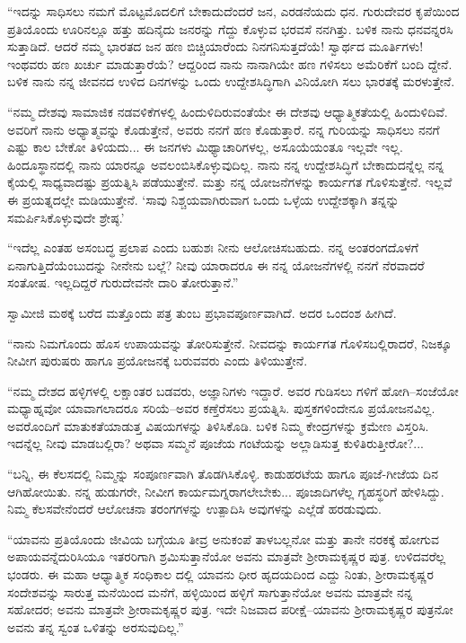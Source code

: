 “ಇದನ್ನು ಸಾಧಿಸಲು ನಮಗೆ ಮೊಟ್ಟಮೊದಲಿಗೆ ಬೇಕಾದುದೆಂದರೆ ಜನ, ಎರಡನೆಯದು ಧನ. ಗುರುದೇವರ ಕೃಪೆಯಿಂದ ಪ್ರತಿಯೊಂದು ಊರಿನಲ್ಲೂ ಹತ್ತು ಹದಿನೈದು ಜನರನ್ನು ಗೆದ್ದು ಕೊಳ್ಳುವ ಭರವಸೆ ನನಗಿತ್ತು. ಬಳಿಕ ನಾನು ಧನವನ್ನರಸಿ ಸುತ್ತಾಡಿದೆ. ಆದರೆ ನಮ್ಮ ಭಾರತದ ಜನ ಹಣ ಬಿಚ್ಚಿಯಾರೆಂದು ನಿನಗನಿಸುತ್ತದೆಯೆ! ಸ್ವಾರ್ಥದ ಮೂರ್ತಿಗಳು! ಇಂಥವರು ಹಣ ಖರ್ಚು ಮಾಡುತ್ತಾರೆಯೆ? ಆದ್ದರಿಂದ ನಾನು ನಾನಾಗಿಯೇ ಹಣ ಗಳಿಸಲು ಅಮೆರಿಕೆಗೆ ಬಂದಿ ದ್ದೇನೆ. ಬಳಿಕ ನಾನು ನನ್ನ ಜೀವನದ ಉಳಿದ ದಿನಗಳನ್ನು ಒಂದು ಉದ್ದೇಶಸಿದ್ಧಿಗಾಗಿ ವಿನಿಯೋಗಿ ಸಲು ಭಾರತಕ್ಕೆ ಮರಳುತ್ತೇನೆ.

“ನಮ್ಮ ದೇಶವು ಸಾಮಾಜಿಕ ನಡವಳಿಕೆಗಳಲ್ಲಿ ಹಿಂದುಳಿದಿರುವಂತೆಯೇ ಈ ದೇಶವು ಆಧ್ಯಾತ್ಮಿಕತೆಯಲ್ಲಿ ಹಿಂದುಳಿದಿವೆ. ಅವರಿಗೆ ನಾನು ಅಧ್ಯಾತ್ಮವನ್ನು ಕೊಡುತ್ತೇನೆ, ಅವರು ನನಗೆ ಹಣ ಕೊಡುತ್ತಾರೆ. ನನ್ನ ಗುರಿಯನ್ನು ಸಾಧಿಸಲು ನನಗೆ ಎಷ್ಟು ಕಾಲ ಬೇಕೋ ತಿಳಿಯದು... ಈ ಜನಗಳು ಮಿಥ್ಯಾಚಾರಿಗಳಲ್ಲ, ಅಸೂಯೆಯಂತೂ ಇಲ್ಲವೇ ಇಲ್ಲ. ಹಿಂದೂಸ್ಥಾನದಲ್ಲಿ ನಾನು ಯಾರನ್ನೂ ಅವಲಂಬಿಸಿಕೊಳ್ಳುವುದಿಲ್ಲ. ನಾನು ನನ್ನ ಉದ್ದೇಶಸಿದ್ಧಿಗೆ ಬೇಕಾದುದನ್ನೆಲ್ಲ ನನ್ನ ಕೈಯಲ್ಲಿ ಸಾಧ್ಯವಾದಷ್ಟು ಪ್ರಯತ್ನಿಸಿ ಪಡೆಯುತ್ತೇನೆ. ಮತ್ತು ನನ್ನ ಯೋಜನೆಗಳನ್ನು ಕಾರ್ಯಗತ ಗೊಳಿಸುತ್ತೇನೆ. ಇಲ್ಲವೆ ಈ ಪ್ರಯತ್ನದಲ್ಲೇ ಮಡಿಯುತ್ತೇನೆ. ‘ಸಾವು ನಿಶ್ಚಯವಾಗಿರುವಾಗ ಒಂದು ಒಳ್ಳೆಯ ಉದ್ದೇಶಕ್ಕಾಗಿ ತನ್ನನ್ನು ಸಮರ್ಪಿಸಿಕೊಳ್ಳುವುದೇ ಶ್ರೇಷ್ಠ.’

“ಇದೆಲ್ಲ ಎಂತಹ ಅಸಂಬದ್ಧ ಪ್ರಲಾಪ ಎಂದು ಬಹುಶಃ ನೀನು ಆಲೋಚಿಸಬಹುದು. ನನ್ನ ಅಂತರಂಗದೊಳಗೆ ಏನಾಗುತ್ತಿದೆಯೆಂಬುದನ್ನು ನೀನೇನು ಬಲ್ಲೆ? ನೀವು ಯಾರಾದರೂ ಈ ನನ್ನ ಯೋಜನೆಗಳಲ್ಲಿ ನನಗೆ ನೆರವಾದರೆ ಸಂತೋಷ. ಇಲ್ಲದಿದ್ದರೆ ಗುರುದೇವನೇ ದಾರಿ ತೋರುತ್ತಾನೆ.”

ಸ್ವಾಮೀಜಿ ಮಠಕ್ಕೆ ಬರೆದ ಮತ್ತೊಂದು ಪತ್ರ ತುಂಬ ಪ್ರಭಾವಪೂರ್ಣವಾಗಿದೆ. ಅದರ ಒಂದಂಶ ಹೀಗಿದೆ.

“ನಾನು ನಿಮಗೊಂದು ಹೊಸ ಉಪಾಯವನ್ನು ತೋರಿಸುತ್ತೇನೆ. ನೀವದನ್ನು ಕಾರ್ಯಗತ ಗೊಳಿಸಬಲ್ಲಿರಾದರೆ, ನಿಜಕ್ಕೂ ನೀವೀಗ ಪುರುಷರು ಹಾಗೂ ಪ್ರಯೋಜನಕ್ಕೆ ಬರುವವರು ಎಂದು ತಿಳಿಯುತ್ತೇನೆ.

“ನಮ್ಮ ದೇಶದ ಹಳ್ಳಿಗಳಲ್ಲಿ ಲಕ್ಷಾಂತರ ಬಡವರು, ಅಜ್ಞಾನಿಗಳು ಇದ್ದಾರೆ. ಅವರ ಗುಡಿಸಲು ಗಳಿಗೆ ಹೋಗಿ–ಸಂಜೆಯೋ ಮಧ್ಯಾಹ್ನವೋ ಯಾವಾಗಲಾದರೂ ಸರಿಯೆ–ಅವರ ಕಣ್ತೆರೆಸಲು ಪ್ರಯತ್ನಿಸಿ. ಪುಸ್ತಕಗಳಿಂದೇನೂ ಪ್ರಯೋಜನವಿಲ್ಲ. ಅವರೊಂದಿಗೆ ಮಾತುಕತೆಯಾಡುತ್ತ ವಿಷಯಗಳನ್ನು ತಿಳಿಸಿಕೊಡಿ. ಬಳಿಕ ನಿಮ್ಮ ಕೇಂದ್ರಗಳನ್ನು ಕ್ರಮೇಣ ವಿಸ್ತರಿಸಿ. ಇದನ್ನೆಲ್ಲ ನೀವು ಮಾಡಬಲ್ಲಿರಾ? ಅಥವಾ ಸಮ್ಮನೆ ಪೂಜೆಯ ಗಂಟೆಯನ್ನು ಅಲ್ಲಾಡಿಸುತ್ತ ಕುಳಿತಿರುತ್ತೀರೋ?...

“ಬನ್ನಿ, ಈ ಕೆಲಸದಲ್ಲಿ ನಿಮ್ಮನ್ನು ಸಂಪೂರ್ಣವಾಗಿ ತೊಡಗಿಸಿಕೊಳ್ಳಿ. ಕಾಡುಹರಟೆಯ ಹಾಗೂ ಪೂಜೆ-ಗೀಜೆಯ ದಿನ ಆಗಿಹೋಯಿತು. ನನ್ನ ಹುಡುಗರೇ, ನೀವೀಗ ಕಾರ್ಯಮಗ್ನರಾಗಲೇಬೇಕು... ಪೂಜಾದಿಗಳೆಲ್ಲ ಗೃಹಸ್ಥರಿಗೆ ಹೇಳಿಸಿದ್ದು. ನಿಮ್ಮ ಕೆಲಸವೇನೆಂದರೆ ಆಲೋಚನಾ ತರಂಗಗಳನ್ನು ಉತ್ಪಾದಿಸಿ ಅವುಗಳನ್ನು ಎಲ್ಲೆಡೆ ಹರಡುವುದು.

“ಯಾವನು ಪ್ರತಿಯೊಂದು ಜೀವಿಯ ಬಗ್ಗೆಯೂ ತೀವ್ರ ಅನುಕಂಪೆ ತಾಳಬಲ್ಲನೋ ಮತ್ತು ತಾನೇ ನರಕಕ್ಕೆ ಹೋಗುವ ಅಪಾಯವನ್ನೆದುರಿಸಿಯೂ ಇತರರಿಗಾಗಿ ಶ್ರಮಿಸುತ್ತಾನೆಯೋ ಅವನು ಮಾತ್ರವೇ ಶ್ರೀರಾಮಕೃಷ್ಣರ ಪುತ್ರ. ಉಳಿದವರೆಲ್ಲ ಭಂಡರು. ಈ ಮಹಾ ಆಧ್ಯಾತ್ಮಿಕ ಸಂಧಿಕಾಲ ದಲ್ಲಿ ಯಾವನು ಧೀರ ಹೃದಯದಿಂದ ಎದ್ದು ನಿಂತು, ಶ್ರೀರಾಮಕೃಷ್ಣರ ಸಂದೇಶವನ್ನು ಸಾರುತ್ತ ಮನೆಯಿಂದ ಮನೆಗೆ, ಹಳ್ಳಿಯಿಂದ ಹಳ್ಳಿಗೆ ಸಾಗುತ್ತಾನೆಯೋ ಅವನು ಮಾತ್ರವೇ ನನ್ನ ಸಹೋದರ; ಅವನು ಮಾತ್ರವೇ ಶ್ರೀರಾಮಕೃಷ್ಣರ ಪುತ್ರ. ಇದೇ ನಿಜವಾದ ಪರೀಕ್ಷೆ–ಯಾವನು ಶ್ರೀರಾಮಕೃಷ್ಣರ ಪುತ್ರನೋ ಅವನು ತನ್ನ ಸ್ವಂತ ಒಳಿತನ್ನು ಅರಸುವುದಿಲ್ಲ.”

